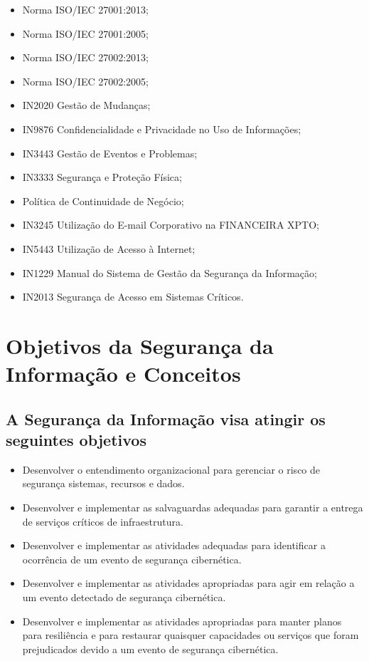 \documentclass[a4paper,12pt]{article}
\begin{document}
\begin{itemize}
    \item Norma ISO/IEC 27001:2013;
    \item Norma ISO/IEC 27001:2005;
    \item Norma ISO/IEC 27002:2013;
    \item Norma ISO/IEC 27002:2005;
    \item IN2020 Gestão de Mudanças;
    \item IN9876 Confidencialidade e Privacidade no Uso de Informações;
    \item IN3443 Gestão de Eventos e Problemas;
    \item IN3333 Segurança e Proteção Física;
    \item Política de Continuidade de Negócio;
    \item IN3245 Utilização do E-mail Corporativo na FINANCEIRA XPTO;
    \item IN5443 Utilização de Acesso à Internet;
    \item IN1229 Manual do Sistema de Gestão da Segurança da Informação;
    \item IN2013 Segurança de Acesso em Sistemas Críticos.
\end{itemize}

\section{Objetivos da Segurança da Informação e Conceitos}

\subsection{A Segurança da Informação visa atingir os seguintes objetivos}

\begin{itemize}
    \item Desenvolver o entendimento organizacional para gerenciar o risco de segurança sistemas, recursos e dados.
    \item Desenvolver e implementar as salvaguardas adequadas para garantir a entrega de serviços críticos de infraestrutura.
    \item Desenvolver e implementar as atividades adequadas para identificar a ocorrência de um evento de segurança cibernética.
    \item Desenvolver e implementar as atividades apropriadas para agir em relação a um evento detectado de segurança cibernética.
    \item Desenvolver e implementar as atividades apropriadas para manter planos para resiliência e para restaurar quaisquer capacidades ou serviços que foram prejudicados devido a um evento de segurança cibernética.
\end{itemize}
\end{document}
